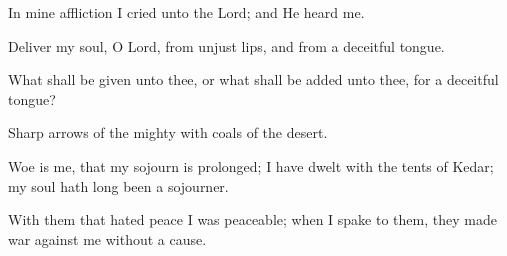 In mine affliction I cried unto the Lord; and He heard me.

Deliver my soul, O Lord, from unjust lips, and from a deceitful tongue.

What shall be given unto thee, or what shall be added unto thee, for a deceitful tongue?

Sharp arrows of the mighty with coals of the desert.

Woe is me, that my sojourn is prolonged; I have dwelt with the tents of Kedar; my soul hath long been a sojourner.

With them that hated peace I was peaceable; when I spake to them, they made war against me without a cause.
